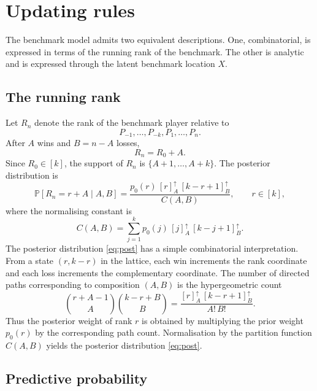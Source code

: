 \documentclass[11pt,reqno]{amsart}
\theoremstyle{definition}
\theoremstyle{remark}
\numberwithin{equation}{section}
\begin{document}
\section{Updating rules}

The benchmark model admits two equivalent descriptions. One, combinatorial, is expressed in terms of the running rank of the benchmark. The other is analytic and is expressed through the latent benchmark location \(X\).

\subsection{The running rank}

Let \(R_n\) denote the rank of the benchmark player relative to
\[
P_{-1},\dots,P_{-k},P_1,\dots,P_n.
\]
After \(A\) wins and \(B=n-A\) losses,
\begin{equation}\label{eq:Rn}
R_n=R_0+A.
\end{equation}
Since \(R_0\in[k]\), the support of \(R_n\) is \(\{A+1,\dots,A+k\}\). The posterior distribution is
\begin{equation}\label{eq:post}
\mathbb{P}[R_n=r+A\mid A,B]=\frac{p_0(r)\,[r]_A^\uparrow\,[k-r+1]_B^\uparrow}{C(A,B)},\qquad r\in[k],
\end{equation}
where the normalising constant is
\begin{equation}\label{eq:C}
C(A,B)=\sum_{j=1}^k p_0(j)\,[j]_A^\uparrow\,[k-j+1]_B^\uparrow.
\end{equation}
The posterior distribution \eqref{eq:post} has a simple combinatorial interpretation. From a state \((r,k-r)\) in the lattice, each win increments the rank coordinate and each loss increments the complementary coordinate. The number of directed paths corresponding to composition \((A,B)\) is the hypergeometric count
\[
\binom{r+A-1}{A}\binom{k-r+B}{B}=\frac{[r]_A^\uparrow\,[k-r+1]_B^\uparrow}{A!\,B!}.
\]
Thus the posterior weight of rank \(r\) is obtained by multiplying the prior weight \(p_0(r)\) by the corresponding path count. Normalisation by the partition function \(C(A,B)\) yields the posterior distribution \eqref{eq:post}.

\subsection{Predictive probability}
\end{document}

